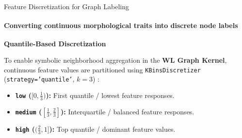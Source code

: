 \documentclass[aspectratio=169, 11pt]{beamer}
\begin{document}
\begin{frame}{Feature Discretization for Graph Labeling}
    \framesubtitle{Converting continuous morphological traits into discrete node labels}

    \textbf{Quantile-Based Discretization}
    \vspace{0.15cm}

    {\footnotesize To enable symbolic neighborhood aggregation in the \textbf{WL Graph Kernel}, continuous feature values are partitioned using \texttt{KBinsDiscretizer} (\texttt{strategy='quantile'}, $k=3$) \cite{pedregosa2011scikit, dougherty1995supervised}:}

    \vspace{0.3cm}
    \begin{itemize}\footnotesize
        \item \textbf{\texttt{low} ($[0, \frac{1}{3})$):} First quantile / lowest feature responses.
        \item \textbf{\texttt{medium} ($[\frac{1}{3}, \frac{2}{3}]$):} Interquartile / balanced feature responses.
        \item \textbf{\texttt{high} ($(\frac{2}{3}, 1]$):} Top quantile / dominant feature values.
    \end{itemize}

    \vspace{0.45cm}
\end{frame}
\end{document}
